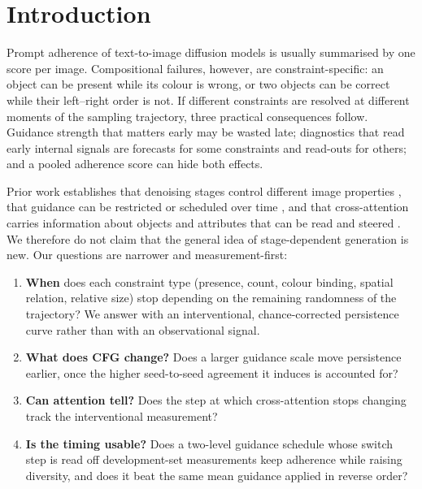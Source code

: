 \section{Introduction}
Prompt adherence of text-to-image diffusion models is usually summarised by one score per image. Compositional failures, however, are constraint-specific: an object can be present while its colour is wrong, or two objects can be correct while their left--right order is not. If different constraints are resolved at different moments of the sampling trajectory, three practical consequences follow. Guidance strength that matters early may be wasted late; diagnostics that read early internal signals are forecasts for some constraints and read-outs for others; and a pooled adherence score can hide both effects.

Prior work establishes that denoising stages control different image properties \citep{patashnik2023mixing,zhang2023prospect,balaji2022ediffi,li2024critical}, that guidance can be restricted or scheduled over time \citep{kynkaanniemi2024interval,sadat2024cads,dynamiccfg2025}, and that cross-attention carries information about objects and attributes that can be read and steered \citep{hertz2023p2p,tang2023daam,chefer2023attend,epstein2023selfguidance}. We therefore do not claim that the general idea of stage-dependent generation is new. Our questions are narrower and measurement-first:
\begin{enumerate}
\item \textbf{When} does each constraint type (presence, count, colour binding, spatial relation, relative size) stop depending on the remaining randomness of the trajectory? We answer with an interventional, chance-corrected persistence curve rather than with an observational signal.
\item \textbf{What does CFG change?} Does a larger guidance scale move persistence earlier, once the higher seed-to-seed agreement it induces is accounted for?
\item \textbf{Can attention tell?} Does the step at which cross-attention stops changing track the interventional measurement?
\item \textbf{Is the timing usable?} Does a two-level guidance schedule whose switch step is read off development-set measurements keep adherence while raising diversity, and does it beat the same mean guidance applied in reverse order?
\end{enumerate}

